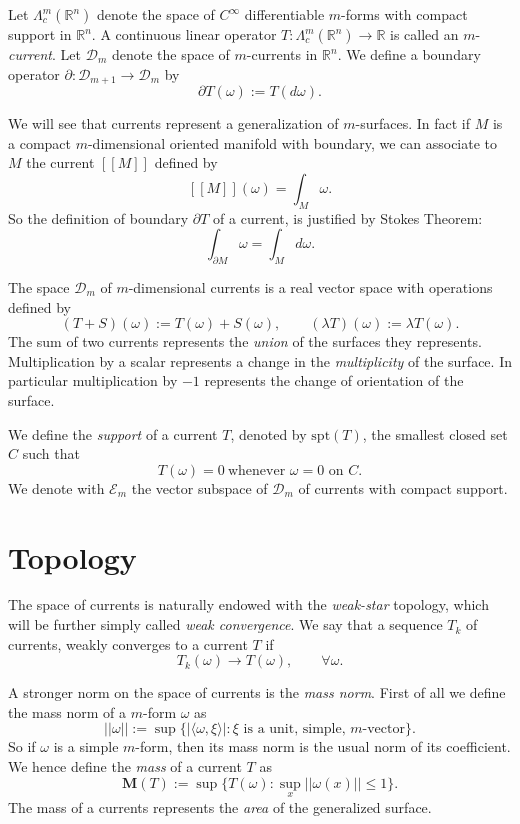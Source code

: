 \documentclass[12pt]{article}
\newcommand{\R}{\mathbb R}
\begin{document}
Let $\Lambda_c^m(\R^n)$ denote the space of $C^\infty$ differentiable $m$-forms with compact support in $\R^n$. A continuous linear operator $T\colon \Lambda_c^m(\R^n)\to \R$ is called an $m$-\emph{current}. Let $\mathcal D_m$ denote the space of $m$-currents in $\R^n$. 
We define a boundary operator $\partial\colon \mathcal D_{m+1}\to \mathcal D_m$ by
\[
  \partial T(\omega) := T(d\omega).
\]

We will see that currents represent a generalization of $m$-surfaces.
In fact if $M$ is a compact $m$-dimensional oriented manifold with boundary, we can associate to $M$ the current $[[M]]$ defined by
\[
  [[M]](\omega)=\int_M \omega.
\]
So the definition of boundary $\partial T$ of a current, is justified by
Stokes Theorem:
\[
  \int_{\partial M} \omega = \int_M d\omega.
\]

The space $\mathcal D_m$ of $m$-dimensional currents is a real vector space with operations defined by
\[
  (T+S)(\omega):= T(\omega)+S(\omega),\qquad
   (\lambda T)(\omega):=\lambda T(\omega).
\]
The sum of two currents represents the \emph{union} of the surfaces they represents. Multiplication by a scalar represents a change in the \emph{multiplicity} of the surface. In particular multiplication by $-1$ represents the change of orientation of the surface.

We define the \emph{support} of a current $T$, denoted by $\mathrm{spt}(T)$, the smallest closed set $C$ such that
\[
  T(\omega)=0\ \text{whenever $\omega=0$ on $C$}.
\]
We denote with $\mathcal E_m$ the vector subspace of $\mathcal D_m$ of currents with compact support.

\section*{Topology}
The space of currents is naturally endowed with the \emph{weak-star} topology, which will be further simply called \emph{weak convergence}. We say that a sequence $T_k$ of currents, weakly converges to a current $T$ if
\[
   T_k(\omega) \to T(\omega),\qquad \forall \omega.
\]

A stronger norm on the space of currents is the \emph{mass norm}. First of all we define the mass norm of a $m$-form $\omega$ as
\[
  ||\omega||:= \sup\{|\langle \omega,\xi\rangle|\colon \text{$\xi$ is a unit, simple, $m$-vector}\}.
\]
So if $\omega$ is a simple $m$-form, then its mass norm is the usual norm of its coefficient. We hence define the \emph{mass} of a current $T$ as
\[
  \mathbf M (T) := \sup\{ T(\omega)\colon \sup_x ||\omega(x)||\le 1\}.
\]
The mass of a currents represents the \emph{area} of the generalized surface.
\end{document}
